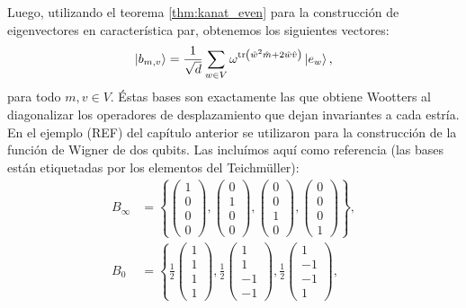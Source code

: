 \documentclass[a4paper,11pt]{report}
\DeclareMathOperator{\tr}{tr}
\begin{document}
  Luego, utilizando el teorema \ref{thm:kanat_even} para la
  construcción de eigenvectores en característica par,
  obtenemos los siguientes vectores:
  \[
    \ket{b_{m,v}}
    = \frac{1}{\sqrt{d}}
    \sum_{w \in V}^{}
    \omega^{\tr\left(
      \hat w^2 \hat m + 2 \hat w \hat v
    \right) } \ket{e_w},
  \] 
  para todo $m,v \in V$. Éstas bases son exactamente las que
  obtiene Wootters al diagonalizar los operadores de
  desplazamiento que dejan invariantes a cada estría. En el
  ejemplo (REF) del capítulo anterior se utilizaron para la
  construcción de la función de Wigner de dos qubits. Las
  incluímos aquí como referencia (las bases están
  etiquetadas por los elementos del Teichmüller):
  \begin{align}
    B_\infty &= \left\{
    \begin{pmatrix} 1\\0\\0\\0 \end{pmatrix},
    \begin{pmatrix} 0\\1\\0\\0 \end{pmatrix},
    \begin{pmatrix} 0\\0\\1\\0 \end{pmatrix},
    \begin{pmatrix} 0\\0\\0\\1 \end{pmatrix}
    \right\}, \\
    B_0 &= \left\{
    \frac{1}{2} \begin{pmatrix} 1\\1\\1\\1 \end{pmatrix}, 
    \frac{1}{2} \begin{pmatrix} 1\\1\\-1\\-1 \end{pmatrix}, 
    \frac{1}{2} \begin{pmatrix} 1\\-1\\-1\\1 \end{pmatrix},

\end{align}
\end{document}
